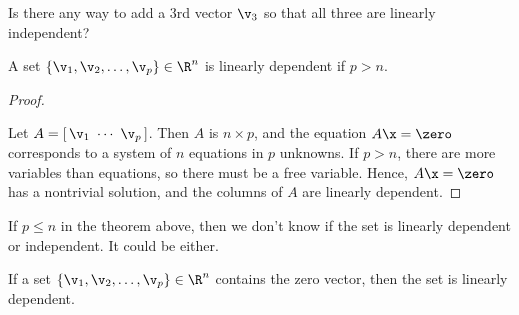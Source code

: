 \begin{figure}[H]
  \centering


  \caption{}
  \label{fig:linear_independence_by_inspection}
\end{figure}

Is there any way to add a 3rd vector $\v_3$ so that all three are linearly
independent? 

\begin{theorem}
  \label{thm:linear_independence_by_inspection}

  A set $\left\{\v_1, \v_2, \ldots, \v_p\right\} \in \R^n$ is
  linearly dependent if $p > n$.
\end{theorem}

\begin{proof}
  \label{prf:linear_independence_by_inspection}

  Let $A = [\,\v_1~\cdots~\v_p\,]$. Then $A$ is $n \times p$, and the equation
  $A\x = \zero$ corresponds to a system of $n$ equations in $p$ unknowns. If $p
  > n$, there are more variables than equations, so there must be a free
  variable. Hence, $A\x = \zero$ has a nontrivial solution, and the columns of
  $A$ are linearly dependent.
\end{proof}

\begin{note}
  \label{nte:linear_independence_by_inspection}

  If $p \leq n$ in the theorem above, then we don't know if the set is linearly
  dependent or independent. It could be either.
\end{note}

\begin{theorem}
  \label{thm:contains_zero_vector}

  If a set $\{\v_1, \v_2, \ldots, \v_p\} \in \R^n$ contains the
  zero vector, then the set is linearly dependent.
\end{theorem}

